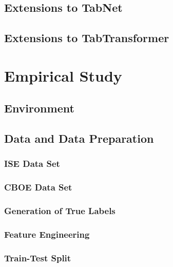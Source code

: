 \subsection{Extensions to TabNet}\label{extensions-to-tabnet}

\subsection{Extensions to
TabTransformer}\label{extensions-to-tabtransformer}

\newpage
\section{Empirical Study}\label{empirical-study}

\subsection{Environment}\label{environment}

\subsection{Data and Data Preparation}\label{data-and-data-preparation}

\subsubsection{ISE Data Set}\label{ise-data-set}

\subsubsection{CBOE Data Set}\label{cboe-data-set}

\subsubsection{Generation of True
Labels}\label{generation-of-true-labels}

\subsubsection{Feature Engineering}\label{feature-engineering}

\subsubsection{Train-Test Split}\label{train-test-split}

